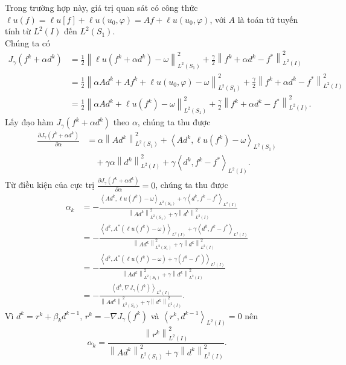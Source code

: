 \documentclass[]{article}
\begin{document}
\noindent Trong trường hợp này, giá trị quan sát có công thức $\ell u(f)=\ell u[f]+\ell u(u_0, \varphi)=Af+\ell u(u_0, \varphi)$, với $A$ là toán tử tuyến tính từ $L^2(I)$ đến $L^2(S_1)$.\\
Chúng ta có
\begin{align*}
	J_{\gamma}(f^k+\alpha d^k)&=\frac{1}{2}\left\|\ell u(f^k+\alpha d^k)-\omega\right\|_{L^2(S_1)}^2+\frac{\gamma}{2}\left\|f^k+\alpha d^k-f^*\right\|_{L^2(I)}^2\\[0.2cm]
	&=\frac{1}{2}\left\|\alpha Ad^k+Af^k+\ell u(u_0, \varphi)-\omega\right\|_{L^2(S_1)}^2+\frac{\gamma}{2}\left\|f^k+\alpha d^k-f^*\right\|_{L^2(I)}^2\\[0.2cm]
	&=\frac{1}{2}\left\|\alpha Ad^k+\ell u(f^k)-\omega\right\|_{L^2(S_1)}^2+\frac{\gamma}{2}\left\|f^k+\alpha d^k-f^*\right\|_{L^2(I)}^2.
\end{align*}
Lấy đạo hàm $J_\gamma(f^k+\alpha d^k)$ theo $\alpha$, chúng ta thu được
\begin{align*}
	\frac{\partial J_\gamma(f^k+\alpha d^k)}{\partial \alpha} &= \alpha\left\|Ad^k \right\|_{L^2(S_1)}^2+\left\langle Ad^k,\ell u(f^k)-\omega\right\rangle_{L^2(S_1)}\\[0.2cm]
	&\quad+\gamma\alpha\left\| d^k\right\|_{L^2(I)}^2+\gamma\left\langle d^k, f^k-f^*\right\rangle_{L^2(I)}.
\end{align*}
Từ điều kiện của cực trị $\frac{\partial J_\gamma(f^k+\alpha d^k)}{\partial \alpha}=0$, chúng ta thu được
\begin{align*}
	\alpha_k&=-\frac{\left\langle Ad^k, \ell u(f^k)-\omega\right\rangle_{L^2(S_1)}+\gamma\left\langle d^k, f^k-f^*\right\rangle_{L^2(I)}}{\left\|Ad^k\right\|^2_{L^2(S_1)}+\gamma\left\|d^k\right\|^2_{L^2(I)}}\\[0.2cm]
	&=-\frac{\left\langle d^k, A^*\left(\ell u(f^k)-\omega\right)\right\rangle_{L^2(I)}+\gamma\left\langle d^k, f^k-f^*\right\rangle_{L^2(I)}}{\left\|Ad^k\right\|^2_{L^2(S_1)}+\gamma\left\|d^k\right\|^2_{L^2(I)}}\\[0.2cm]
	&=-\frac{\left\langle d^k, A^*\left(\ell u(f^k)-\omega\right)+\gamma(f^k-f^*)\right\rangle_{L^2(I)}}{\left\|Ad^k\right\|^2_{L^2(S_1)}+\gamma\left\|d^k\right\|^2_{L^2(I)}}\\[0.2cm]
	&=-\frac{\left\langle d^k,\nabla J_\gamma(f^k)\right\rangle_{L^2(I)}}{\left\|Ad^k\right\|^2_{L^2(S_1)}+\gamma\left\|d^k\right\|^2_{L^2(I)}}.
\end{align*}
Vì $d^k=r^k+\beta_kd^{k-1},\, r^k=-\nabla J_\gamma (f^k)$ và $\left\langle r^k,d^{k-1}\right\rangle_{L^2(I)}=0$ nên 
$$\alpha_k=\frac{\left\|r^k\right\|^2_{L^2(I)}}{\left\|Ad^k\right\|^2_{L^2(S_1)}+\gamma\left\|d^k\right\|^2_{L^2(I)}}.$$
\end{document}

